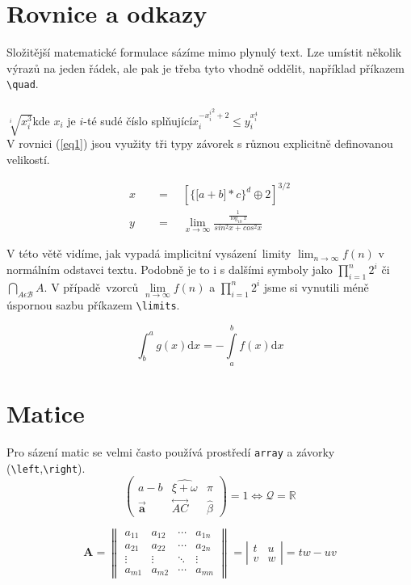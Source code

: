 \documentclass[a4paper, 11pt]{article}
\begin{document}
\section{Rovnice a odkazy}
Složitější matematické formulace sázíme mimo plynulý
text. Lze umístit několik výrazů na jeden řádek, ale pak je
třeba tyto vhodně oddělit, například příkazem {\verb!\quad!}.
\\ \\
$\sqrt[i]{x^3_i}$\quad kde $x_i$ je $i$-té sudé číslo splňující\quad $x_{i}^{{{-x_{i}^i}^2}+2} \leq y_{i}^{x_{i}^4}$\\
    
    V rovnici (\ref{eq1}) jsou využity tři typy závorek s různou explicitně definovanou velikostí.
    
\begin{align} \label{eq1}
    x\quad &=\quad \left[\Big\{\big[a+b\big]*c\Big\}^d\oplus2\right]^{3/2}\\
    y\quad  &=\quad \lim_{x\to\infty} \frac{\frac{1}{\log_{10}x}}{sin^2x + cos^2x}\nonumber
\end{align}


    V této větě vidíme, jak vypadá implicitní vysázení~li\-mity $\lim_{n\to\infty}f(n)$ v normálním odstavci textu. Podobně je to i s dalšími symboly jako $\prod^n_{i=1} 2^i$ či $\bigcap_{A\epsilon \mathcal{B}}A$. V pří\-padě~vzorců $\lim\limits_{n\to\infty} f(n)$ a $\prod\limits^n_{i=1} 2^i$ jsme si vynutili méně úspornou sazbu příkazem {\verb!\limits!}.
    
\begin{equation} \label{eq2}
    \int^a_b g(x)\text{d}x = - \int\limits^b_a f(x)\text{d}x
\end{equation}

\section{Matice}
Pro sázení matic se velmi často používá prostředí \texttt{array} a závorky ({\verb!\left!},{\verb!\right!}).
\begin{equation}
\begin{pmatrix}
a-b & \widehat{\xi+\omega} & \pi\\
\vec{\textbf{a}} & \overset{\longleftrightarrow}{AC} &\hat{\beta}
\end{pmatrix}=1 \iff \mathcal{Q} = \mathbb{R}
\nonumber
\end{equation}

\begin{equation}
\textbf{A}=
\begin{Vmatrix}
a_{11} & a_{12} & \cdots & a_{1n}\\
a_{21} & a_{22} & \cdots & a_{2n}\\
\vdots & \vdots & \ddots & \vdots\\
a_{m1} & a_{m2} & \cdots & a_{mn}
\end{Vmatrix}
=
\left| \begin{array}{cc}
t & u\\
v & w
\end{array}\right|
= tw-uv
\nonumber
\end{equation}
    
\end{document}
